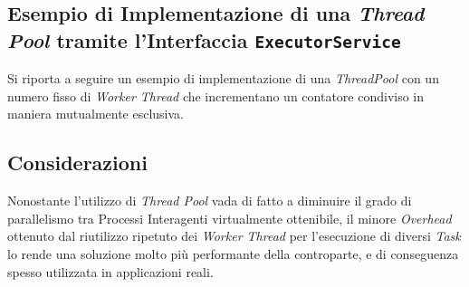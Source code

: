 \subsection[Esempio di Implementazione di una \textit{Thread Pool} tramite \texttt{ExecutorService}]{Esempio di Implementazione di una \textit{Thread Pool} tramite l'Interfaccia \texttt{ExecutorService}}
Si riporta a seguire un esempio di implementazione di una \textit{ThreadPool} con un numero fisso di \textit{Worker Thread} che incrementano un contatore condiviso in maniera mutualmente esclusiva.

\subsection{Considerazioni}
Nonostante l'utilizzo di \textit{Thread Pool} vada di fatto a diminuire il grado di parallelismo tra Processi Interagenti virtualmente ottenibile, il minore \textit{Overhead} ottenuto dal riutilizzo ripetuto dei \textit{Worker Thread} per l'esecuzione di diversi \textit{Task} lo rende una soluzione molto più performante della controparte, e di conseguenza spesso utilizzata in applicazioni reali.